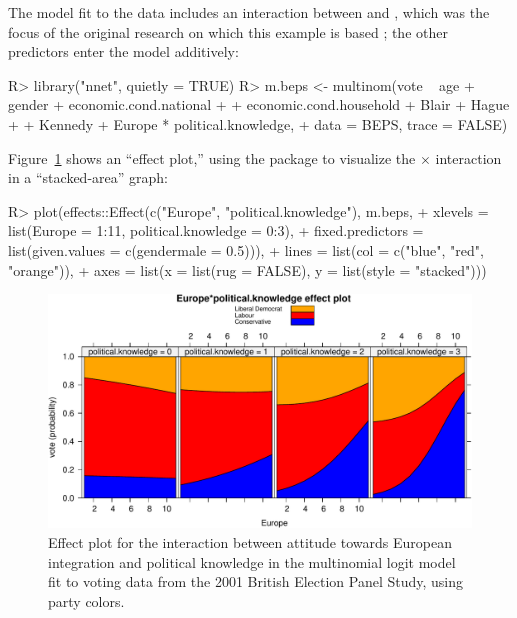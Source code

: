 \documentclass[
]{jss}
\begin{document}
The model fit to the data includes an interaction between 
and , which was the focus of the original
research on which this example is based
\citep{AndersenHeathSinnott:2002}; the other predictors enter the model
additively:

\begin{CodeChunk}
\begin{CodeInput}
R> library("nnet", quietly = TRUE)
R> m.beps <- multinom(vote ~ age + gender + economic.cond.national
+                         + economic.cond.household + Blair + Hague
+                         + Kennedy + Europe * political.knowledge,
+                    data = BEPS, trace = FALSE)
\end{CodeInput}
\end{CodeChunk}

Figure~\ref{fig:BEPS-plot} shows an ``effect plot,'' using the
 package \citep{FoxWeisberg:2019} to visualize the
 \(\times\)  interaction in a
``stacked-area'' graph:

\begin{CodeChunk}
\begin{CodeInput}
R> plot(effects::Effect(c("Europe", "political.knowledge"), m.beps,
+             xlevels = list(Europe = 1:11, political.knowledge = 0:3),
+             fixed.predictors = list(given.values = c(gendermale = 0.5))),
+      lines = list(col = c("blue", "red", "orange")),
+      axes = list(x = list(rug = FALSE), y = list(style = "stacked")))
\end{CodeInput}
\begin{figure}

{\centering \includegraphics{Figures/BEPS-plot-1}

}

\caption[Effect plot for the interaction between attitude towards European integration and political knowledge in the multinomial logit model fit to voting data from the 2001 British Election Panel Study, using party colors]{Effect plot for the interaction between attitude towards European integration and political knowledge in the multinomial logit model fit to voting data from the 2001 British Election Panel Study, using party colors.}\label{fig:BEPS-plot}
\end{figure}
\end{CodeChunk}
\end{document}
